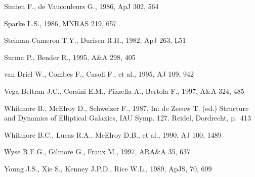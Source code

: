 \documentclass[twocolumns]{aa}
\begin{document}
\begin{thebibliography}{}
 Simien F.,
  de Vaucouleurs G., 1986, ApJ 302, 564

 Sparke L.S., 1986, MNRAS 219, 657 

  Steiman-Cameron T.Y., Durisen R.H., 1982, ApJ 263, L51 

 Surma P., Bender R., 
  1995, A\&A 298, 405 

  van Driel W., Combes F., 
  Casoli F., et al.,
  1995, AJ 109, 942

 Vega Beltran J.C., 
  Corsini E.M., Pizzella A., Bertola F., 1997, A\&A 324, 485 

 Whitmore B., 
  McElroy D., Schweizer F., 1987, In: de Zeeuw T. (ed.)
  Structure and Dynamics of Elliptical Galaxies, IAU Symp. 127.
  Reidel, Dordrecht, p.~413

 Whitmore B.C., Lucas R.A., 
  McElroy D.B., et al.,
  1990, AJ 100, 1489

 Wyse R.F.G., 
  Gilmore G., Franx M., 1997, ARA\&A 35, 637 

 Young J.S., Xie S., Kenney J.P.D.,
  Rice W.L., 1989, ApJS, 70, 699

\end{thebibliography}
\end{document}
